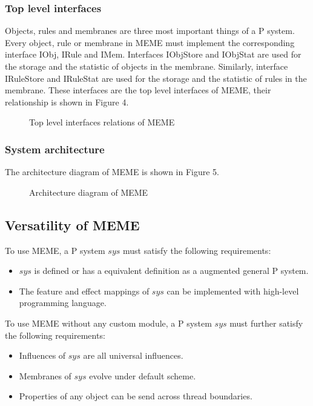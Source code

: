 \documentclass[9pt,a4paper,twoside]{article}
\newcommand\figpath{../assets/figures/}
\begin{document}
        \subsubsection{Top level interfaces}
        Objects, rules and membranes are three most important things of a P system. Every object, rule or membrane in MEME must implement the corresponding interface IObj, IRule and IMem. Interfaces IObjStore and IObjStat are used for the storage and the statistic of objects in the membrane. Similarly, interface IRuleStore and IRuleStat are used for the storage and the statistic of rules in the membrane. These interfaces are the top level interfaces of MEME, their relationship is shown in Figure 4.
        \begin{figure}[!htbp]
            \centering
            
            \caption{Top level interfaces relations of MEME}
            \label{fig:fig4}
        \end{figure}

        \subsubsection{System architecture}
        The architecture diagram of MEME is shown in Figure 5.
        \begin{figure}[!htbp]
            \centering
            
            \caption{Architecture diagram of MEME}
            \label{fig:fig5}
        \end{figure}

    \subsection{Versatility of MEME}
    To use MEME, a P system $sys$ must satisfy the following requirements:
    \begin{itemize}
        \item $sys$ is defined or has a equivalent definition as a augmented general P system.
        \item The feature and effect mappings of $sys$ can be implemented with high-level programming language.
    \end{itemize}

    To use MEME without any custom module, a P system $sys$ must further satisfy the following requirements:
     \begin{itemize}
        \item Influences of $sys$ are all universal influences.
        \item Membranes of $sys$ evolve under default scheme.
        \item Properties of any object can be send across thread boundaries.
    \end{itemize}
\end{document}
